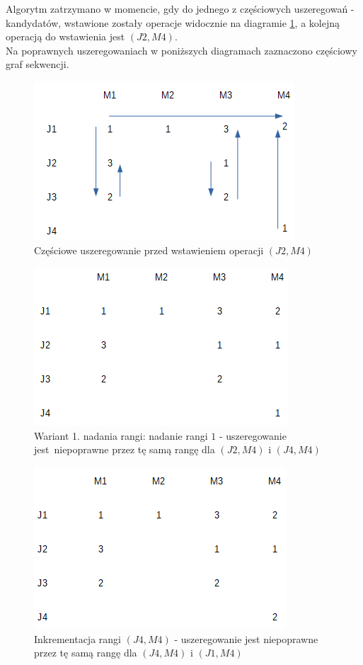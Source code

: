 \documentclass[brudnopis]{xmgr}
\begin{document}
Algorytm zatrzymano w momencie, gdy do jednego z częściowych uszeregowań - kandydatów, wstawione zostały operacje widocznie na diagramie \ref{diag:state0}, a kolejną operacją do wstawienia jest $(J2, M4)$.\\
Na poprawnych uszeregowaniach w poniższych diagramach zaznaczono częściowy graf sekwencji.

\begin{figure}[!tbh]
\centering
\includegraphics[width=.7\hsize]{fig/0.png}
\caption{Częściowe uszeregowanie przed wstawieniem operacji $(J2, M4)$\label{diag:state0}}
\end{figure}\medskip

\begin{figure}[!tbh]
\centering
\includegraphics[width=.7\hsize]{fig/1_0.png}
\caption{Wariant 1. nadania rangi: nadanie rangi $1$ - uszeregowanie jest~niepoprawne przez tę samą rangę dla $(J2, M4)$ i $(J4, M4)$\label{diag:state1_0}}
\end{figure}\medskip

\begin{figure}[!tbh]
\centering
\includegraphics[width=.7\hsize]{fig/1_1.png}
\caption{Inkrementacja rangi $(J4, M4)$ - uszeregowanie jest niepoprawne przez tę samą rangę dla $(J4, M4)$ i $(J1, M4)$\label{diag:state1_1}}
\end{figure}\medskip
\end{document}
